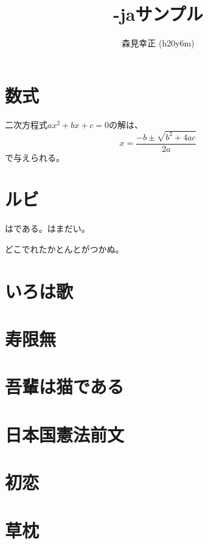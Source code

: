 \documentclass[a4paper,12pt,tombow]{xltjsarticle}
\title{\XeLaTeX-jaサンプル}
\author{森見幸正 (h20y6m)}
\begin{document}
\maketitle

\section{数式}

二次方程式$ax^2+bx+c=0$の解は、
\[ x = \frac{-b\pm\sqrt{b^2+4ac}}{2a} \]
で与えられる。

\section{ルビ}

はである。はまだい。

どこでれたかとんとがつかぬ。

\section{いろは歌}

\section{寿限無}

\section{吾輩は猫である}

\section{日本国憲法前文}

\section{初恋}

\section{草枕}
\end{document}
